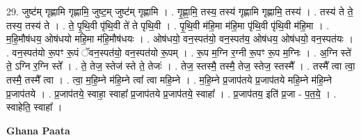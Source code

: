 \documentclass[17pt]{extarticle}
\begin{document}
29. जुष्ट॑म् गृह्णामि गृह्णामि॒ जुष्ट॒म् जुष्ट॑म् गृह्णामि । . गृ॒ह्णा॒मि॒ तस्य॒ तस्य॑ गृह्णामि गृह्णामि॒ तस्य॑ । . तस्य॑ ते ते॒ तस्य॒ तस्य॑ ते । . ते॒ पृ॒थि॒वी पृ॑थि॒वी ते॑ ते पृथि॒वी । . पृ॒थि॒वी म॑हि॒मा म॑हि॒मा पृ॑थि॒वी पृ॑थि॒वी म॑हि॒मा । . म॒हि॒मौष॑धय॒ ओष॑धयो महि॒मा म॑हि॒मौष॑धयः । . ओष॑धयो॒ वन॒स्पत॑यो॒ वन॒स्पत॑य॒ ओष॑धय॒ ओष॑धयो॒ वन॒स्पत॑यः । . वन॒स्पत॑यो रू॒पꣳ रू॒पं ॅवन॒स्पत॑यो॒ वन॒स्पत॑यो रू॒पम् । . रू॒प म॒ग्नि र॒ग्नी रू॒पꣳ रू॒प म॒ग्निः । . अ॒ग्नि स्ते॑ ते॒ ऽग्नि र॒ग्नि स्ते᳚ । . ते॒ तेज॒ स्तेज॑ स्ते ते॒ तेजः॑ । . तेज॒ स्तस्मै॒ तस्मै॒ तेज॒ स्तेज॒ स्तस्मै᳚ । . तस्मै᳚ त्वा त्वा॒ तस्मै॒ तस्मै᳚ त्वा । . त्वा॒ म॒हि॒म्ने म॑हि॒म्ने त्वा᳚ त्वा महि॒म्ने । . म॒हि॒म्ने प्र॒जाप॑तये प्र॒जाप॑तये महि॒म्ने म॑हि॒म्ने प्र॒जाप॑तये । . प्र॒जाप॑तये॒ स्वाहा॒ स्वाहा᳚ प्र॒जाप॑तये प्र॒जाप॑तये॒ स्वाहा᳚ । . प्र॒जाप॑तय॒ इति॑ प्र॒जा - प॒त॒ये॒ । . स्वाहेति॒ स्वाहा᳚ । \newline

\textbf{Ghana Paata } \newline
\end{document}
